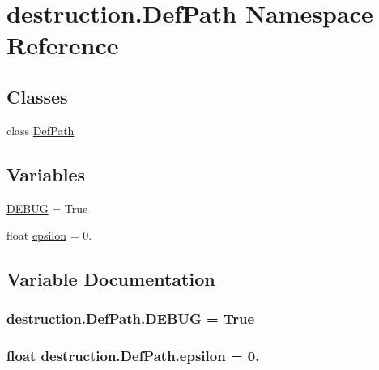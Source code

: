 \hypertarget{namespacedestruction_1_1_def_path}{\section{destruction.\-Def\-Path Namespace Reference}
\label{namespacedestruction_1_1_def_path}
}
\subsection*{Classes}
\begin{DoxyCompactItemize}
\item 
class \hyperlink{classdestruction_1_1_def_path_1_1_def_path}{Def\-Path}
\end{DoxyCompactItemize}
\subsection*{Variables}
\begin{DoxyCompactItemize}
\item 
\hyperlink{namespacedestruction_1_1_def_path_a133c1205970ac8edd967f1db708d9cbe}{D\-E\-B\-U\-G} = True
\item 
float \hyperlink{namespacedestruction_1_1_def_path_a5e0b810d2cd7471f71e00fbc1b3c388f}{epsilon} = 0.
\end{DoxyCompactItemize}


\subsection{Variable Documentation}
\hypertarget{namespacedestruction_1_1_def_path_a133c1205970ac8edd967f1db708d9cbe}{
\subsubsection[{D\-E\-B\-U\-G}]{\setlength{\rightskip}{0pt plus 5cm}destruction.\-Def\-Path.\-D\-E\-B\-U\-G = True}}\label{namespacedestruction_1_1_def_path_a133c1205970ac8edd967f1db708d9cbe}
\hypertarget{namespacedestruction_1_1_def_path_a5e0b810d2cd7471f71e00fbc1b3c388f}{
\subsubsection[{epsilon}]{\setlength{\rightskip}{0pt plus 5cm}float destruction.\-Def\-Path.\-epsilon = 0.}}\label{namespacedestruction_1_1_def_path_a5e0b810d2cd7471f71e00fbc1b3c388f}
